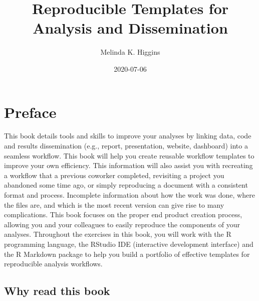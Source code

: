 \documentclass[
]{book}
\title{Reproducible Templates for Analysis and Dissemination}
\author{Melinda K. Higgins}
\date{2020-07-06}
\begin{document}
\maketitle

{
\setcounter{tocdepth}{1}
\tableofcontents
}
\listoftables
\listoffigures
\hypertarget{preface}{%
\chapter*{Preface}\label{preface}}


This book details tools and skills to improve your analyses by linking data, code and results dissemination (e.g., report, presentation, website, dashboard) into a seamless workflow. This book will help you create reusable workflow templates to improve your own efficiency. This information will also assist you with recreating a workflow that a previous coworker completed, revisiting a project you abandoned some time ago, or simply reproducing a document with a consistent format and process. Incomplete information about how the work was done, where the files are, and which is the most recent version can give rise to many complications. This book focuses on the proper end product creation process, allowing you and your colleagues to easily reproduce the components of your analyses. Throughout the exercises in this book, you will work with the R programming language, the RStudio IDE (interactive development interface) and the R Markdown package to help you build a portfolio of effective templates for reproducible analysis workflows.

\hypertarget{why-read-this-book}{%
\section*{Why read this book}\label{why-read-this-book}}
\end{document}
